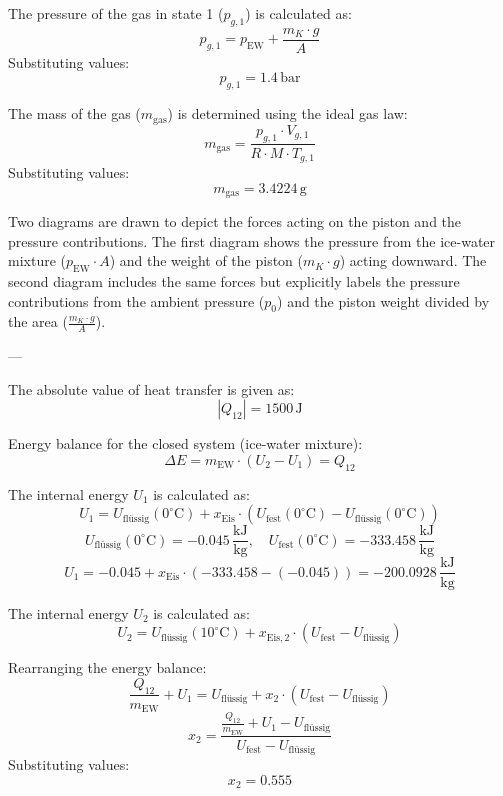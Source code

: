 The pressure of the gas in state 1 (\( p_{g,1} \)) is calculated as:  
\[
p_{g,1} = p_{\text{EW}} + \frac{m_K \cdot g}{A}
\]  
Substituting values:  
\[
p_{g,1} = 1.4 \, \text{bar}
\]  

The mass of the gas (\( m_{\text{gas}} \)) is determined using the ideal gas law:  
\[
m_{\text{gas}} = \frac{p_{g,1} \cdot V_{g,1}}{R \cdot M \cdot T_{g,1}}
\]  
Substituting values:  
\[
m_{\text{gas}} = 3.4224 \, \text{g}
\]  

Two diagrams are drawn to depict the forces acting on the piston and the pressure contributions. The first diagram shows the pressure from the ice-water mixture (\( p_{\text{EW}} \cdot A \)) and the weight of the piston (\( m_K \cdot g \)) acting downward. The second diagram includes the same forces but explicitly labels the pressure contributions from the ambient pressure (\( p_0 \)) and the piston weight divided by the area (\( \frac{m_K \cdot g}{A} \)).  

---

The absolute value of heat transfer is given as:  
\[
|Q_{12}| = 1500 \, \text{J}
\]  

Energy balance for the closed system (ice-water mixture):  
\[
\Delta E = m_{\text{EW}} \cdot (U_2 - U_1) = Q_{12}
\]  

The internal energy \( U_1 \) is calculated as:  
\[
U_1 = U_{\text{flüssig}}(0^\circ\text{C}) + x_{\text{Eis}} \cdot \left( U_{\text{fest}}(0^\circ\text{C}) - U_{\text{flüssig}}(0^\circ\text{C}) \right)
\]  
\[
U_{\text{flüssig}}(0^\circ\text{C}) = -0.045 \, \frac{\text{kJ}}{\text{kg}}, \quad U_{\text{fest}}(0^\circ\text{C}) = -333.458 \, \frac{\text{kJ}}{\text{kg}}
\]  
\[
U_1 = -0.045 + x_{\text{Eis}} \cdot (-333.458 - (-0.045)) = -200.0928 \, \frac{\text{kJ}}{\text{kg}}
\]  

The internal energy \( U_2 \) is calculated as:  
\[
U_2 = U_{\text{flüssig}}(10^\circ\text{C}) + x_{\text{Eis},2} \cdot \left( U_{\text{fest}} - U_{\text{flüssig}} \right)
\]  

Rearranging the energy balance:  
\[
\frac{Q_{12}}{m_{\text{EW}}} + U_1 = U_{\text{flüssig}} + x_2 \cdot (U_{\text{fest}} - U_{\text{flüssig}})
\]  
\[
x_2 = \frac{\frac{Q_{12}}{m_{\text{EW}}} + U_1 - U_{\text{flüssig}}}{U_{\text{fest}} - U_{\text{flüssig}}}
\]  
Substituting values:  
\[
x_2 = 0.555
\]